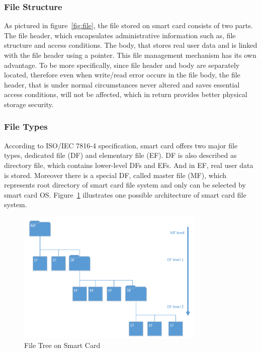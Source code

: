 \subsubsection{File Structure}
As pictured in figure~\ref{fig:file}, the file stored on smart card consists of two parts.  The file header, which encapsulates administrative information such as, file structure and access conditions. The body, that stores real user data and is linked with the file header using a pointer. This file management mechanism has its own advantage. To be more specifically, since file header and body are separately located, therefore even when write/read error occurs in the file body, the file header, that is under normal circumstances never altered and saves essential access conditions, will not be affected, which in return provides better physical storage security.

\subsubsection{File Types}
According to ISO/IEC 7816-4 specification, smart card offers two major file types, dedicated file (DF) and elementary file (EF). DF is also described as directory file, which contains lower-level DFs and EFs. And in EF, real user data is stored. Moreover there is a special DF, called master file (MF), which represents root directory of smart card file system and only can be selected by smart card OS. Figure~\ref{fig:file-structure} illustrates one possible architecture of smart card file system.

\begin{figure}[!htbp]
	\centering
	\includegraphics[width=0.8\textwidth]{file-structure}
		\caption{File Tree on Smart Card \cite{handbuch}}
	\label{fig:file-structure}
\end{figure}

